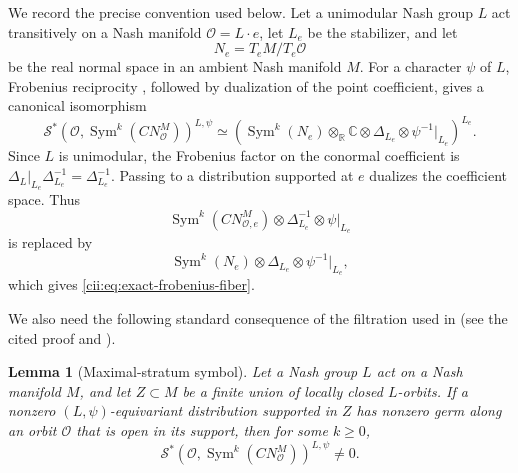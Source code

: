 \documentclass[10pt,a4paper]{amsart}
\numberwithin{equation}{section}
\newtheorem{lemma}[theorem]{Lemma}
\newcommand{\C}{\mathbb C}
\newcommand{\R}{\mathbb R}
\newcommand{\Sym}{\operatorname{Sym}}
\newcommand{\cS}{\mathcal S}
\begin{document}
We record the precise convention used below.  Let a unimodular Nash group
\(L\) act transitively on a Nash manifold \(\mathcal O=L\cdot e\), let
\(L_e\) be the stabilizer, and let
\[
  N_e=T_eM/T_e\mathcal O
\]
be the real normal space in an ambient Nash manifold \(M\).  For a character
\(\psi\) of \(L\), Frobenius reciprocity
\cite[Theorem~2.5.7]{AG09}, followed by dualization of the point coefficient,
gives a canonical isomorphism
\begin{equation}\label{cii:eq:exact-frobenius-fiber}
\cS^*\!\left(
  \mathcal O,\Sym^k(CN_{\mathcal O}^{M})
\right)^{L,\psi}
\simeq
\left(
  \Sym^k(N_e)\otimes_{\R}\C
  \otimes\Delta_{L_e}\otimes\psi^{-1}|_{L_e}
\right)^{L_e}.
\end{equation}
Since \(L\) is unimodular, the Frobenius factor on the conormal
coefficient is
\(\Delta_L|_{L_e}\Delta_{L_e}^{-1}=\Delta_{L_e}^{-1}\).  Passing to a
distribution supported at \(e\) dualizes the coefficient space.  Thus
\[
  \Sym^k(CN_{\mathcal O,e}^{M})\otimes
  \Delta_{L_e}^{-1}\otimes\psi|_{L_e}
\]
is replaced by
\[
  \Sym^k(N_e)\otimes\Delta_{L_e}\otimes\psi^{-1}|_{L_e},
\]
which gives \eqref{cii:eq:exact-frobenius-fiber}.

We also need the following standard consequence of the filtration used in
\cite[Theorem~2.5.6]{AG09} (see the cited proof and
\cite[Section~B.2]{AGS08}).

\begin{lemma}[Maximal-stratum symbol]\label{cii:lem:maximal-symbol}
Let a Nash group \(L\) act on a Nash manifold \(M\), and let
\(Z\subset M\) be a finite union of locally closed \(L\)-orbits.  If a
nonzero \((L,\psi)\)-equivariant distribution supported in \(Z\) has
nonzero germ along an orbit \(\mathcal O\) that is open in its support,
then for some \(k\geq0\),
\[
  \cS^*\!\left(
    \mathcal O,\Sym^k(CN_{\mathcal O}^{M})
  \right)^{L,\psi}\neq0.
\]
\end{lemma}
\end{document}
